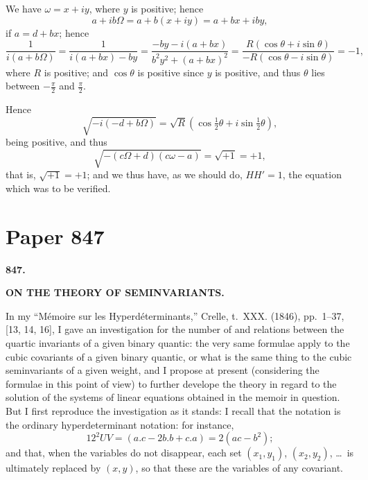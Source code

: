 \documentclass[11pt,a4paper]{book}
\begin{document}
We have $\omega = x + iy$, where $y$ is positive; hence
\[
a + ib\Omega = a + b(x + iy) = a + bx + iby,
\]
if $a = d + bx$; hence
\[
\frac{1}{i(a + b\Omega)} = \frac{1}{i(a + bx) - by} = \frac{-by - i(a + bx)}{b^2y^2 + (a + bx)^2} = \frac{R(\cos\theta + i\sin\theta)}{-R(\cos\theta - i\sin\theta)} = -1,
\]
where $R$ is positive; and $\cos\theta$ is positive since $y$ is positive, and thus $\theta$ lies between $-\frac{\pi}{2}$ and $\frac{\pi}{2}$.

Hence
\[
\sqrt{-i(-d + b\Omega)} = \sqrt{R}(\cos\tfrac{1}{2}\theta + i\sin\tfrac{1}{2}\theta),
\]
being positive, and thus
\[
\sqrt{-(c\Omega + d)(c\omega - a)} = \sqrt{+1} = +1,
\]
that is, $\sqrt{+1} = +1$; and we thus have, as we should do, $HH' = 1$, the equation which was to be verified.

\newpage

\section{Paper 847}

\begin{center}
\large\textbf{847.}

\Large\textbf{ON THE THEORY OF SEMINVARIANTS.}

\end{center}

\bigskip

In my ``M\'{e}moire sur les Hyperd\'{e}terminants,'' Crelle, t.~XXX. (1846), pp.~1--37, [13, 14, 16], I gave an investigation for the number of and relations between the quartic invariants of a given binary quantic: the very same formulae apply to the cubic covariants of a given binary quantic, or what is the same thing to the cubic seminvariants of a given weight, and I propose at present (considering the formulae in this point of view) to further develope the theory in regard to the solution of the systems of linear equations obtained in the memoir in question. But I first reproduce the investigation as it stands: I recall that the notation is the ordinary hyperdeterminant notation: for instance,
\[
12^2UV = (a.c - 2b.b + c.a) = 2(ac - b^2);
\]
and that, when the variables do not disappear, each set $(x_1, y_1)$, $(x_2, y_2)$, \ldots\ is ultimately replaced by $(x, y)$, so that these are the variables of any covariant.
\end{document}
